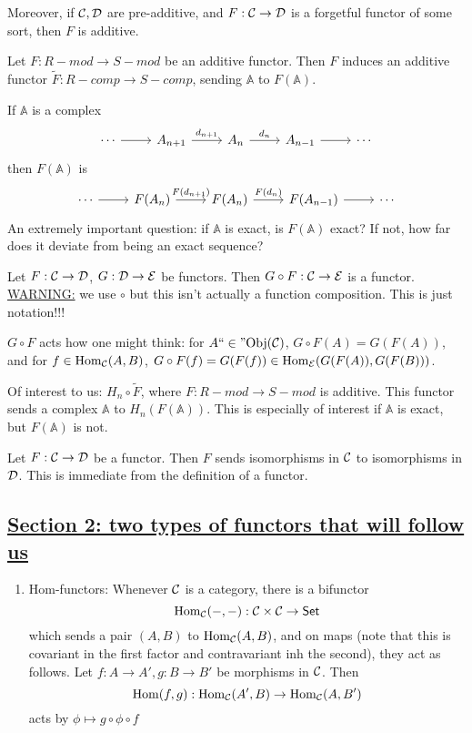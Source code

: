 \documentclass[x11names,reqno,14pt]{extarticle}
\newcommand{\A}{\mathbb{A}}
\newcommand{\fin}{``\in"}
\begin{document}
Moreover, if $\mathcal{C},\mathcal{D}$ are pre-additive, and $F:\mathcal{C}\to\mathcal{D}$ is a forgetful functor of some sort, then $F$ is additive. 

\exm

Let $F:R-mod\to S-mod$ be an additive functor. Then $F$ induces an additive functor $\tilde{F}:R-comp\to S-comp$, sending $\A$ to $F(\A)$. 

If $\A$ is a complex 
\[
\begin{tikzcd}
\cdots \ar[r]& A_{n + 1}\ar[r,"d_{n + 1}"] & A_n\ar[r, "d_n"] & A_{n - 1} \ar[r] & \cdots 
\end{tikzcd}
\]
then $F(\A)$ is 
\[
\begin{tikzcd}
\cdots\ar[r]&F(A_n)\ar[r,"F(d_{n + 1})"]&F(A_n)\ar[r, "F(d_n)"]&F(A_{n - 1})\ar[r]&\cdots 
\end{tikzcd}
\]
An extremely important question: if $\A$ is exact, is $F(\A)$ exact? If not, how far does it deviate from being an exact sequence? 

\exm

Let $F:\mathcal{C}\to\mathcal{D}$, $G:\mathcal{D}\to\mathcal{E}$ be functors. Then $G \circ F:\mathcal{C}\to\mathcal{E}$ is a functor. \underline{WARNING:} we use $\circ$ but this isn't actually a function composition. This is just notation!!!

$G \circ F$ acts how one might think: for $A\fin\Obj(\mc{C})$, $G\circ F(A) = G(F(A))$, and for $f\in{\mathrm{Hom}}_{\mathcal{C}}(A, B)$, $G \circ F(f) = G(F(f))\in{\mathrm{Hom}}_{\mathcal{E}}(G(F(A)), G(F(B)))$.

Of interest to us: $H_n \circ \tilde{F}$, where $F:R-mod\to S-mod$ is additive. This functor sends a complex $\A$ to $H_n(F(\A))$. This is especially of interest if $\A$ is exact, but $F(\A)$ is not. 

\rem

Let $F:\mathcal{C}\to\mathcal{D}$ be a functor. Then $F$ sends isomorphisms in $\mathcal{C}$ to isomorphisms in $\mathcal{D}$. This is immediate from the definition of a functor. 

\subsection*{\underline{Section 2: two types of functors that will follow us}}

\begin{enumerate}[label=(\roman*)]
\item Hom-functors: Whenever $\mathcal{C}$ is a category, there is a bifunctor 
\[
{\mathrm{Hom}}_{\mathcal{C}}(-,-):\mathcal{C}\times\mathcal{C}\to{{\text{\sffamily {Set}}}}
\]
which sends a pair $(A, B)$ to ${\mathrm{Hom}}_{\mathcal{C}}(A, B)$, and on maps (note that this is covariant in the first factor and contravariant inh the second), they act as follows. Let $f:A\to A', g:B\to B'$ be morphisms in $\mathcal{C}$. Then 
\[
{\mathrm{Hom}}(f, g):{\mathrm{Hom}}_{\mathcal{C}}(A', B)\to{\mathrm{Hom}}_{\mathcal{C}}(A, B')
\]
acts by $\phi\mapsto g \circ \phi \circ f$
\end{enumerate}
\end{document}
